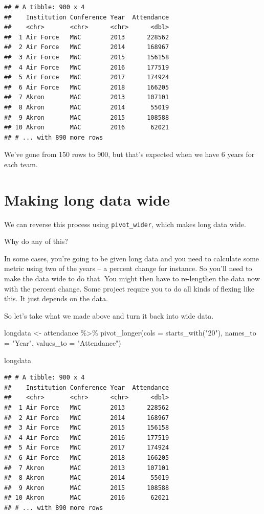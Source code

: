 \documentclass[
]{book}
\newenvironment{Shaded}{\begin{snugshade}}{\end{snugshade}}
\newcommand{\AttributeTok}[1]{\textcolor[rgb]{0.77,0.63,0.00}{#1}}
\newcommand{\FunctionTok}[1]{\textcolor[rgb]{0.00,0.00,0.00}{#1}}
\newcommand{\NormalTok}[1]{#1}
\newcommand{\OtherTok}[1]{\textcolor[rgb]{0.56,0.35,0.01}{#1}}
\newcommand{\SpecialCharTok}[1]{\textcolor[rgb]{0.00,0.00,0.00}{#1}}
\newcommand{\StringTok}[1]{\textcolor[rgb]{0.31,0.60,0.02}{#1}}
\begin{document}
\begin{verbatim}
## # A tibble: 900 x 4
##    Institution Conference Year  Attendance
##    <chr>       <chr>      <chr>      <dbl>
##  1 Air Force   MWC        2013      228562
##  2 Air Force   MWC        2014      168967
##  3 Air Force   MWC        2015      156158
##  4 Air Force   MWC        2016      177519
##  5 Air Force   MWC        2017      174924
##  6 Air Force   MWC        2018      166205
##  7 Akron       MAC        2013      107101
##  8 Akron       MAC        2014       55019
##  9 Akron       MAC        2015      108588
## 10 Akron       MAC        2016       62021
## # ... with 890 more rows
\end{verbatim}

We've gone from 150 rows to 900, but that's expected when we have 6 years for each team.

\hypertarget{making-long-data-wide}{%
\section{Making long data wide}\label{making-long-data-wide}}

We can reverse this process using \texttt{pivot\_wider}, which makes long data wide.

Why do any of this?

In some cases, you're going to be given long data and you need to calculate some metric using two of the years -- a percent change for instance. So you'll need to make the data wide to do that. You might then have to re-lengthen the data now with the percent change. Some project require you to do all kinds of flexing like this. It just depends on the data.

So let's take what we made above and turn it back into wide data.

\begin{Shaded}
\begin{Highlighting}[]
\NormalTok{longdata }\OtherTok{\textless{}{-}}\NormalTok{ attendance }\SpecialCharTok{\%\textgreater{}\%} \FunctionTok{pivot\_longer}\NormalTok{(}\AttributeTok{cols =} \FunctionTok{starts\_with}\NormalTok{(}\StringTok{"20"}\NormalTok{), }\AttributeTok{names\_to =} \StringTok{"Year"}\NormalTok{, }\AttributeTok{values\_to =} \StringTok{"Attendance"}\NormalTok{)}

\NormalTok{longdata}
\end{Highlighting}
\end{Shaded}

\begin{verbatim}
## # A tibble: 900 x 4
##    Institution Conference Year  Attendance
##    <chr>       <chr>      <chr>      <dbl>
##  1 Air Force   MWC        2013      228562
##  2 Air Force   MWC        2014      168967
##  3 Air Force   MWC        2015      156158
##  4 Air Force   MWC        2016      177519
##  5 Air Force   MWC        2017      174924
##  6 Air Force   MWC        2018      166205
##  7 Akron       MAC        2013      107101
##  8 Akron       MAC        2014       55019
##  9 Akron       MAC        2015      108588
## 10 Akron       MAC        2016       62021
## # ... with 890 more rows
\end{verbatim}
\end{document}
